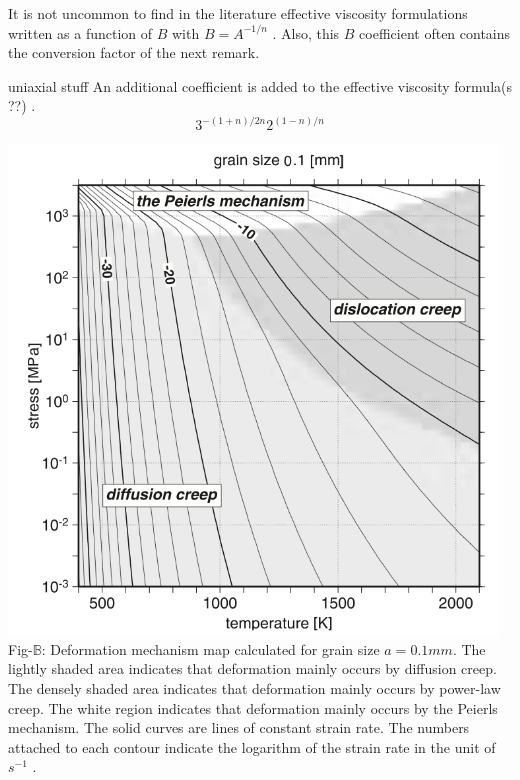 \begin{remark}
It is not uncommon to find in the literature effective viscosity formulations written as a function 
of $B$ with $B=A^{-1/n}$ \cite{wabj08,wabj08b,wabj08c}. Also, this $B$ coefficient often contains the conversion 
factor of the next remark.
\end{remark}

\begin{remark}
uniaxial stuff 
An additional coefficient is added to the effective viscosity formula(s ??) \cite{grpy12,grpy13}.
\[
3^{-(1+n)/2n}2^{(1-n)/n}
\] 
\cite{ranalli}
\end{remark}

\begin{center}
\includegraphics[width=13cm]{images/rheology/defmap}\\
{\captionfont Fig-$\mathds{B}$: Deformation mechanism map calculated for grain size $a=0.1mm$. The lightly shaded area indicates 
that deformation mainly occurs by diffusion creep. The densely shaded area indicates that 
deformation mainly occurs by power-law creep. 
The white region indicates that deformation mainly occurs by the Peierls mechanism. The 
solid curves are lines of constant strain rate. The numbers attached to each contour indicate the 
logarithm of the strain rate in the unit of $s^{-1}$ \cite{kayk99}.}
\end{center}



